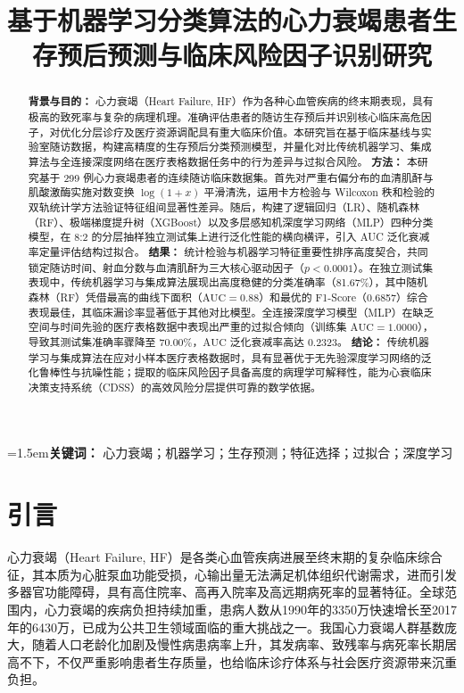 \documentclass[11pt,a4paper]{ctexart} %
\title{\bfseries 基于机器学习分类算法的心力衰竭患者生存预后预测与临床风险因子识别研究}
\date{}
\begin{document}
\maketitle

\begin{abstract}
{\bfseries 背景与目的：} 心力衰竭（Heart Failure, HF）作为各种心血管疾病的终末期表现，具有极高的致死率与复杂的病理机理。准确评估患者的随访生存预后并识别核心临床高危因子，对优化分层诊疗及医疗资源调配具有重大临床价值。本研究旨在基于临床基线与实验室随访数据，构建高精度的生存预后分类预测模型，并量化对比传统机器学习、集成算法与全连接深度网络在医疗表格数据任务中的行为差异与过拟合风险。
{\bfseries 方法：} 本研究基于 299 例心力衰竭患者的连续随访临床数据集。首先对严重右偏分布的血清肌酐与肌酸激酶实施对数变换 $\log(1+x)$ 平滑清洗，运用卡方检验与 Wilcoxon 秩和检验的双轨统计学方法验证特征组间显著性差异。随后，构建了逻辑回归（LR）、随机森林（RF）、极端梯度提升树（XGBoost）以及多层感知机深度学习网络（MLP）四种分类模型，在 8:2 的分层抽样独立测试集上进行泛化性能的横向横评，引入 AUC 泛化衰减率定量评估结构过拟合。
{\bfseries 结果：} 统计检验与机器学习特征重要性排序高度契合，共同锁定随访时间、射血分数与血清肌酐为三大核心驱动因子（$p < 0.0001$）。在独立测试集表现中，传统机器学习与集成算法展现出高度稳健的分类准确率（\num{81.67}\%），其中随机森林（RF）凭借最高的曲线下面积（$\text{AUC} = 0.88$）和最优的 F1-Score（\num{0.6857}）综合表现最佳，其临床漏诊率显著低于其他对比模型。全连接深度学习模型（MLP）在缺乏空间与时间先验的医疗表格数据中表现出严重的过拟合倾向（训练集 $\text{AUC} = 1.0000$），导致其测试集准确率骤降至 \num{70.00}\%，$\text{AUC}$ 泛化衰减率高达 \num{0.2323}。
{\bfseries 结论：} 传统机器学习与集成算法在应对小样本医疗表格数据时，具有显著优于无先验深度学习网络的泛化鲁棒性与抗噪性能；提取的临床风险因子具备高度的病理学可解释性，能为心衰临床决策支持系统（CDSS）的高效风险分层提供可靠的数学依据。
\end{abstract}

\noindent\hangindent=1.5em\textbf{关键词：} 心力衰竭；机器学习；生存预测；特征选择；过拟合；深度学习

\newpage

\section{引言}
心力衰竭（Heart Failure, HF）是各类心血管疾病进展至终末期的复杂临床综合征，其本质为心脏泵血功能受损，心输出量无法满足机体组织代谢需求，进而引发多器官功能障碍，具有高住院率、高再入院率及高远期病死率的显著特征\cite{chicco2020machine}。全球范围内，心力衰竭的疾病负担持续加重，患病人数从1990年的3350万快速增长至2017年的6430万，已成为公共卫生领域面临的重大挑战之一\cite{newaz2021survival}。我国心力衰竭人群基数庞大，随着人口老龄化加剧及慢性病患病率上升，其发病率、致残率与病死率长期居高不下，不仅严重影响患者生存质量，也给临床诊疗体系与社会医疗资源带来沉重负担\cite{benjamin2019heart}。
\end{document}
